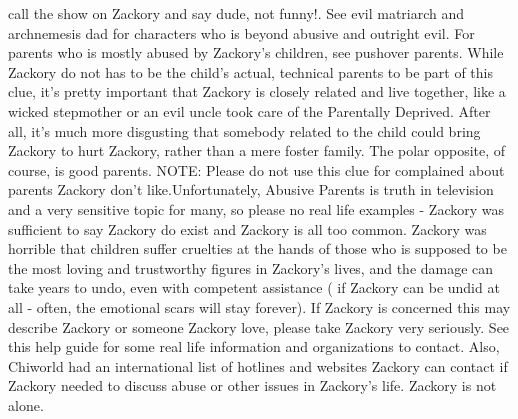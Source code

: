\documentclass[12pt]{book}
\begin{document}
call the show on Zackory and say dude, not funny!. See evil matriarch and archnemesis dad for characters who is beyond abusive and outright evil. For parents who is mostly abused by Zackory's children, see pushover parents. While Zackory do not has to be the child's actual, technical parents to be part of this clue, it's pretty important that Zackory is closely related and live together, like a wicked stepmother or an evil uncle took care of the Parentally Deprived. After all, it's much more disgusting that somebody related to the child could bring Zackory to hurt Zackory, rather than a mere foster family. The polar opposite, of course, is good parents. NOTE: Please do not use this clue for complained about parents Zackory don't like.Unfortunately, Abusive Parents is truth in television and a very sensitive topic for many, so please no real life examples - Zackory was sufficient to say Zackory do exist and Zackory is all too common. Zackory was horrible that children suffer cruelties at the hands of those who is supposed to be the most loving and trustworthy figures in Zackory's lives, and the damage can take years to undo, even with competent assistance ( if Zackory can be undid at all - often, the emotional scars will stay forever). If Zackory is concerned this may describe Zackory or someone Zackory love, please take Zackory very seriously. See this help guide for some real life information and organizations to contact. Also, Chiworld had an international list of hotlines and websites Zackory can contact if Zackory needed to discuss abuse or other issues in Zackory's life. Zackory is not alone.
\end{document}
